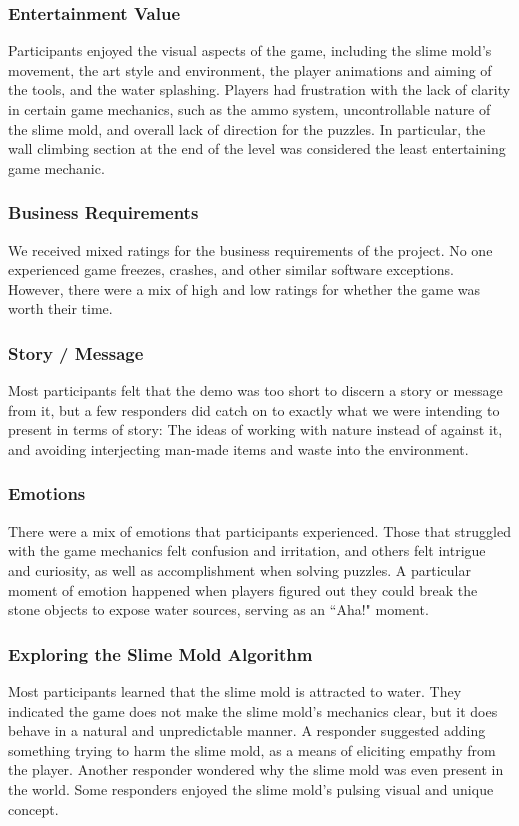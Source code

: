 \documentclass[12pt, titlepage]{article}
\begin{document}
\subsubsection{Entertainment Value}
Participants enjoyed the visual aspects of the game, including the
slime mold's movement, the art style and environment, the player
animations and aiming of the tools, and the water splashing.
Players had frustration with the lack of clarity in certain game
mechanics, such as the ammo system, uncontrollable nature of
the slime mold, and overall lack of direction for the puzzles.
In particular, the wall climbing section at the end of the level
was considered the least entertaining game mechanic.

\subsubsection{Business Requirements}
We received mixed ratings for the business requirements of the
project. No one experienced game freezes, crashes, and other
similar software exceptions. However, there were a mix of high
and low ratings for whether the game was worth their time.

\subsubsection{Story / Message}
Most participants felt that the demo was too short to discern
a story or message from it, but a few responders did catch on to
exactly what we were intending to present in terms of story: The
ideas of working with nature instead of against it, and avoiding
interjecting man-made items and waste into the environment.

\subsubsection{Emotions}
There were a mix of emotions that participants experienced. Those that
struggled with the game mechanics felt confusion and irritation,
and others felt intrigue and curiosity, as well as accomplishment
when solving puzzles. A particular moment of emotion happened when
players figured out they could break the stone objects to expose
water sources, serving as an ``Aha!" moment.

\subsubsection{Exploring the Slime Mold Algorithm}
Most participants learned that the slime mold is attracted to water.
They indicated the game does not make the slime mold's mechanics
clear, but it does behave in a natural and unpredictable manner.
A responder suggested adding something trying to harm the slime mold,
as a means of eliciting empathy from the player. Another responder
wondered why the slime mold was even present in the world.
Some responders enjoyed the slime mold's pulsing visual and unique
concept.
\end{document}
